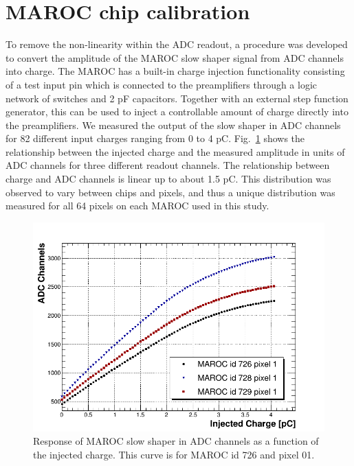 \section{MAROC chip calibration}

To remove the non-linearity within the ADC readout, a procedure was developed to convert the amplitude of the MAROC slow shaper signal from ADC channels into charge. The MAROC has a built-in charge injection functionality consisting of a test input pin which is connected to the preamplifiers through a logic network of switches and 2 pF capacitors. Together with an external step function generator, this can be used to inject a controllable amount of charge directly into the preamplifiers. We measured the output of the slow shaper in ADC channels for 82 different input charges ranging from 0 to 4 pC. Fig.~\ref{fig:MAROCcalib} shows the relationship between the injected charge and the measured amplitude in units of ADC channels for three different readout channels. The relationship between charge and ADC channels is linear up to about 1.5 pC. This distribution was observed to vary between chips and pixels, and thus a unique distribution was measured for all 64 pixels on each MAROC used in this study. 

\begin{figure}[hbt]
	\centering
	\includegraphics[width=\linewidth]{figures/adc_v_charge.png}
	\caption{Response of MAROC slow shaper in ADC channels as a function of the injected charge. This curve is for MAROC id 726 and pixel 01.}
	\label{fig:MAROCcalib}
\end{figure}

